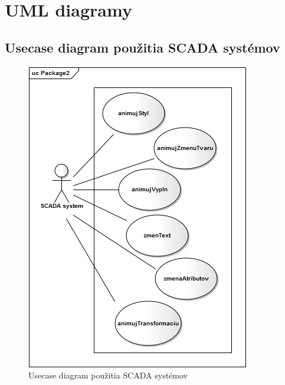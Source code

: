 \chapter{UML diagramy}
	\section{Usecase diagram použitia SCADA systémov}
	\begin{figure}[H]
		\centering
		\includegraphics[width=0.50\linewidth]{uml/usecase.png}
		\caption{Usecase diagram použitia SCADA systémov}
		\label{fig:USECASE}
	\end{figure}

